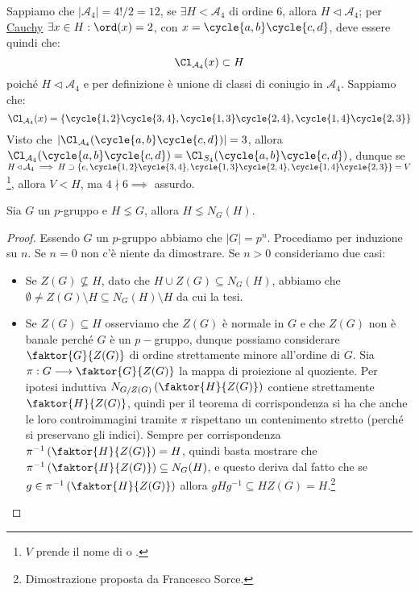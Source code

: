 \documentclass[11pt]{scrartcl}
\begin{document}
\begin{example}
    Sappiamo che $|\mathcal{A}_4| = 4!/2 = 12$, se $\exists H < \mathcal{A}_4$ di ordine $6$, allora $H \triangleleft \mathcal{A}_4$; per \hyperref[p:Cauchy]{Cauchy}
    $\exists x \in H : \ord(x) = 2$, con $x = \cycle{a,b}\cycle{c,d}$, deve essere quindi che:
        \[ \Cl_{\mathcal{A}_4}(x) \subset H
            \]
    poiché $H \triangleleft \mathcal{A}_4$ e per definizione è unione di classi di coniugio in $\mathcal{A}_4$. Sappiamo che:
        \[ \Cl_{\mathcal{A}_4}(x) = \{ \cycle{1,2}\cycle{3,4}, \cycle{1,3}\cycle{2,4}, \cycle{1,4}\cycle{2,3}\}
            \]
    Visto che $|\Cl_{\mathcal{A}_4}(\cycle{a,b} \cycle{c,d})| = 3$, allora $\Cl_{\mathcal{A}_4}(\cycle{a,b} \cycle{c,d}) = \Cl_{S_4}(\cycle{a,b} \cycle{c,d})$,
    dunque se $H \triangleleft \mathcal{A}_4 \implies H \supset \{e, \cycle{1,2}\cycle{3,4}, \cycle{1,3}\cycle{2,4}, \cycle{1,4}\cycle{2,3}\} = V$ \footnote{$V$ prende il nome di  o .},
    allora $V < H$, ma $4 \nmid 6 \implies$ assurdo.
\end{example}

\begin{lemma}
    \label{l:1.95}
    Sia $G$ un $p$-gruppo e $H \lneq G$, allora $H \lneq N_G(H)$.
\end{lemma}

\begin{proof}
    Essendo $G$ un $p$-gruppo abbiamo che $|G|=p^n$. Procediamo per induzione su $n$. Se $n=0$ non c'è niente da dimostrare. Se $n>0$ consideriamo due casi: 
    \begin{itemize}
        \item Se $Z(G)\not\subseteq H$, dato che $H\cup Z(G)\subseteq N_G(H)$, abbiamo che $\emptyset\neq Z(G)\setminus H\subseteq N_G(H)\setminus H$ da cui la tesi.
        \item Se $Z(G)\subseteq H$ osserviamo che $Z(G)$ è normale in $G$ e che $Z(G)$ non è banale perché $G$ è un $p-$gruppo, dunque possiamo considerare $\faktor{G}{Z(G)}$
        di ordine strettamente minore all'ordine di $G$. Sia $\pi:G \longrightarrow \faktor{G}{Z(G)}$ la mappa di proiezione al quoziente. Per ipotesi induttiva $N_{G/Z(G)}\left(\faktor{H}{Z(G)}\right)$ contiene strettamente $\faktor{H}{Z(G)}$, quindi per il teorema di corrispondenza si ha che anche
        le loro controimmagini tramite $\pi$ rispettano un contenimento stretto (perché si preservano gli indici). Sempre per corrispondenza $\pi^{-1}\left(\faktor{H}{Z(G)}\right)=H$, quindi basta mostrare che $\pi^{-1}\left(\faktor{H}{Z(G)}\right)\subseteq N_G(H)$, e questo deriva 
        dal fatto che se $g\in \pi^{-1}\left(\faktor{H}{Z(G)}\right)$ allora $gHg^{-1}\subseteq HZ(G)=H$.\footnote{Dimostrazione proposta da Francesco Sorce.}
    \end{itemize}
\end{proof}
\end{document}
